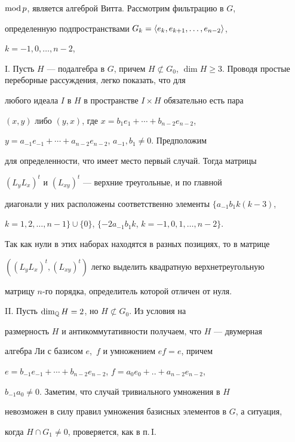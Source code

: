 $\operatorname{mod} p$, является алгеброй Витта. Рассмотрим фильтрацию в $G$, 


определенную подпространствами $G_k=\langle e_k,e_{k+1},\dotsc,e_{n-2}\rangle$, 


$k=-1,0,\dotsc,n-2$,  


 


I. Пусть $H$ --- подалгебра в $G$, причем $H\not\subset G_0$, $\dim 


H\ge3$. Проводя простые переборные рассуждения, легко показать, что для 


любого идеала $I$ в $H$ в пространстве $I\times H$ обязательно есть пара 


$(x,y)$ либо $(y,x)$, где $x=b_1e_1+\dotsb+b_{n-2}e_{n-2}$, 


$y=a_{-1}e_{-1}+\dotsb+a_{n-2}e_{n-2}$, $a_{-1},b_1\ne0$. Предположим 


для определенности, что имеет место первый случай. Тогда матрицы 


$(L_yL_x)^t$ и $(L_{xy})^t$ --- верхние треугольные, и по главной 


диагонали у них расположены соответственно элементы $\{a_{-1}b_1k(k-3)$, 


$k=1,2,\dotsc,n-1\}\cup\{0\}$, $\{-2a_{-1}b_1k$, $k=-1,0,1,\dotsc,n-2\}$. 


Так как нули в этих наборах находятся в разных позициях, то в матрице 


$((L_yL_x)^t,(L_{xy})^t)$ легко выделить квадратную верхнетреугольную 


матрицу $n$-го порядка, определитель которой отличен от нуля.  


 


II. Пусть $\dim_{\Bbb Q}H=2$, но $H\not\subset G_0$. Из условия на 


размерность $H$ и антикоммутативности получаем, что $H$ --- двумерная 


алгебра Ли с базисом $e$,~$f$ и умножением $ef=e$, причем \linebreak


$e=b_{-1}e_{-1}+\dotsb+b_{n-2}e_{n-2}$, $f=a_0e_0+.. +a_{n-2}e_{n-2}$, 


$b_{-1}a_0\ne0$. Заметим, что случай тривиального умножения в $H$ 


невозможен в силу правил умножения базисных элементов в $G$, а ситуация, 


когда $H\cap G_1\ne0$, проверяется, как в п.\,I.  


